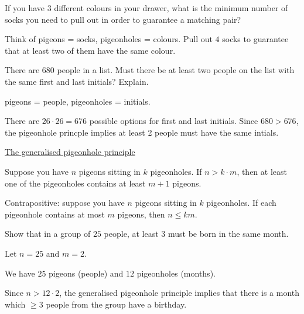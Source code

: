 \begin{example}
    If you have $3$ different colours in your drawer, what is the minimum number of socks you need to pull out in order to guarantee a matching pair?

    Think of pigeons = socks, pigeonholes = colours. Pull out $4$ socks to guarantee that at least two of them have the same colour.
\end{example}

\begin{example}
    There are $680$ people in a list. Must there be at least two people on the list with the same first and last initials? Explain.

    pigeons = people, pigeonholes = initials.

    There are $26\cdot 26 = 676$ possible options for first and last initials. Since $680 > 676$, the pigeonhole princple implies at least 2 people must have the same intials.
\end{example}

\begin{definition}
    \underline{The generalised pigeonhole principle}

    Suppose you have $n$ pigeons sitting in $k$ pigeonholes. If $n>k\cdot m$, then at least one of the pigeonholes contains at least $m+1$ pigeons.

    Contrapositive: suppose you have $n$ pigeons sitting in $k$ pigeonholes. If each pigeonhole contains at most $m$ pigeons, then $n\leq km$.
\end{definition}

\begin{example}
    Show that in a group of $25$ people, at least $3$ must be born in the same month.

    Let $n=25$ and $m=2$.

    We have $25$ pigeons (people) and $12$ pigeonholes (months).

    Since $n > 12\cdot 2$, the generalised pigeonhole principle implies that there is a month which $\geq 3$ people from the group have a birthday.
\end{example}
